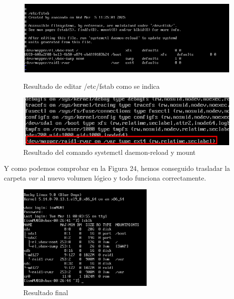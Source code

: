 \begin{figure}[htbp]
  \centering
  \begin{minipage}[b]{0.45\textwidth}
      \centering
      \includegraphics[width=\textwidth]{images/Bloque1/fstab.png}
      \caption{Resultado de editar /etc/fstab como se indica}
  \end{minipage}
  \hfill
  \begin{minipage}[b]{0.45\textwidth}
      \centering
      \includegraphics[width=\textwidth]{images/Bloque1/daemon.png}
      \caption{Resultado del comando systemctl daemon-reload y mount}
  \end{minipage}
\end{figure}

Y como podemos comprobar en la Figura 24, hemos conseguido trasladar la carpeta \textit{var} al nuevo volumen lógico y todo funciona correctamente.

\begin{figure}[H]
  \centering
  \includegraphics[width=0.6\textwidth]{images/Bloque1/resultadofinal_raid.png}
  \caption{Resultado final}
\end{figure}

